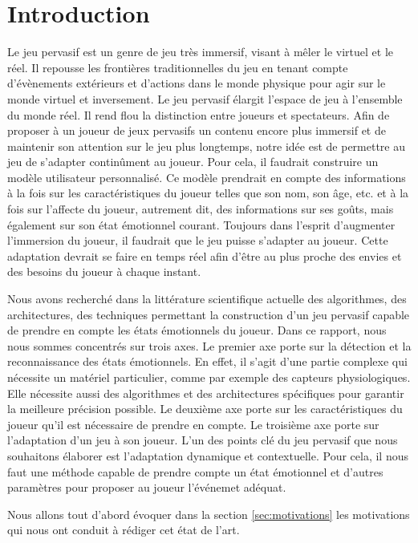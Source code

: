 \documentclass{article}
\begin{document}
\section{Introduction}
    Le jeu pervasif est un genre de jeu très immersif, visant à mêler le virtuel et le réel. 
    Il repousse les frontières traditionnelles du jeu en tenant compte d’évènements extérieurs et d’actions dans le monde physique pour agir sur le monde virtuel et inversement. 
    Le jeu pervasif élargit l’espace de jeu à l’ensemble du monde réel. 
    Il rend flou la distinction entre joueurs et spectateurs. 
    Afin de proposer à un joueur de jeux pervasifs un contenu encore plus immersif et de maintenir son attention sur le jeu plus longtemps, notre idée est de permettre au jeu de s’adapter continûment au joueur. 
    Pour cela, il faudrait construire un modèle utilisateur personnalisé. 
    Ce modèle prendrait en compte des informations à la fois sur les caractéristiques du joueur telles que son nom, son âge, etc. et à la fois sur l’affecte du joueur, autrement dit, des informations sur ses goûts, mais également sur son état émotionnel courant.
    Toujours dans l'esprit d'augmenter l'immersion du joueur, il faudrait que le jeu puisse s'adapter au joueur.
    Cette adaptation devrait se faire en temps réel afin d'être au plus proche des envies et des besoins du joueur à chaque instant.\par
    Nous avons recherché dans la littérature scientifique actuelle des algorithmes, des architectures, des techniques permettant la construction d'un jeu pervasif capable de prendre en compte les états émotionnels du joueur.
    Dans ce rapport, nous nous sommes concentrés sur trois axes.
    Le premier axe porte sur la détection et la reconnaissance des états émotionnels.
    En effet, il s'agit d'une partie complexe qui nécessite un matériel particulier, comme par exemple des capteurs physiologiques.
    Elle nécessite aussi des algorithmes et des architectures spécifiques pour garantir la meilleure précision possible.
    Le deuxième axe porte sur les caractéristiques du joueur qu'il est nécessaire de prendre en compte.
    Le troisième axe porte sur l'adaptation d'un jeu à son joueur.
    L'un des points clé du jeu pervasif que nous souhaitons élaborer est l'adaptation dynamique et contextuelle.
    Pour cela, il nous faut une méthode capable de prendre compte un état émotionnel et d'autres paramètres pour proposer au joueur l'événemet adéquat.\par
    Nous allons tout d'abord évoquer dans la section \ref{sec:motivations} les motivations qui nous ont conduit à rédiger cet état de l'art. 
\end{document}
